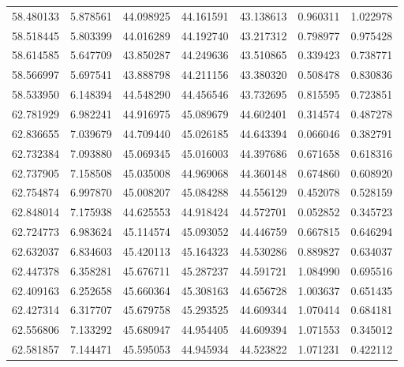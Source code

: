 \begin{tabular}{rrrrrrr}
 58.480133 &   5.878561 &         44.098925 &         44.161591 &         43.138613 &  0.960311 &  1.022978 \\
 58.518445 &   5.803399 &         44.016289 &         44.192740 &         43.217312 &  0.798977 &  0.975428 \\
 58.614585 &   5.647709 &         43.850287 &         44.249636 &         43.510865 &  0.339423 &  0.738771 \\
 58.566997 &   5.697541 &         43.888798 &         44.211156 &         43.380320 &  0.508478 &  0.830836 \\
 58.533950 &   6.148394 &         44.548290 &         44.456546 &         43.732695 &  0.815595 &  0.723851 \\
 62.781929 &   6.982241 &         44.916975 &         45.089679 &         44.602401 &  0.314574 &  0.487278 \\
 62.836655 &   7.039679 &         44.709440 &         45.026185 &         44.643394 &  0.066046 &  0.382791 \\
 62.732384 &   7.093880 &         45.069345 &         45.016003 &         44.397686 &  0.671658 &  0.618316 \\
 62.737905 &   7.158508 &         45.035008 &         44.969068 &         44.360148 &  0.674860 &  0.608920 \\
 62.754874 &   6.997870 &         45.008207 &         45.084288 &         44.556129 &  0.452078 &  0.528159 \\
 62.848014 &   7.175938 &         44.625553 &         44.918424 &         44.572701 &  0.052852 &  0.345723 \\
 62.724773 &   6.983624 &         45.114574 &         45.093052 &         44.446759 &  0.667815 &  0.646294 \\
 62.632037 &   6.834603 &         45.420113 &         45.164323 &         44.530286 &  0.889827 &  0.634037 \\
 62.447378 &   6.358281 &         45.676711 &         45.287237 &         44.591721 &  1.084990 &  0.695516 \\
 62.409163 &   6.252658 &         45.660364 &         45.308163 &         44.656728 &  1.003637 &  0.651435 \\
 62.427314 &   6.317707 &         45.679758 &         45.293525 &         44.609344 &  1.070414 &  0.684181 \\
 62.556806 &   7.133292 &         45.680947 &         44.954405 &         44.609394 &  1.071553 &  0.345012 \\
 62.581857 &   7.144471 &         45.595053 &         44.945934 &         44.523822 &  1.071231 &  0.422112 \\

\end{tabular}
